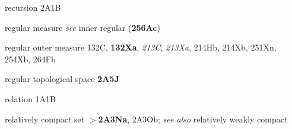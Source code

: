 

recursion 2A1B













































regular measure {\it see} 
inner regular ({\bf 256Ac})


















regular outer measure 132C, {\bf 132Xa},
  {\it 213C}, {\it 213Xa}, 214Hb, 214Xb, 251Xn, 254Xb, 264Fb
  



regular topological space {\bf 2A5J}








relation 1A1B














relatively compact set $\pmb{>}${\bf 2A3Na}, 2A3Ob; 
  {\it see also} relatively weakly compact




















